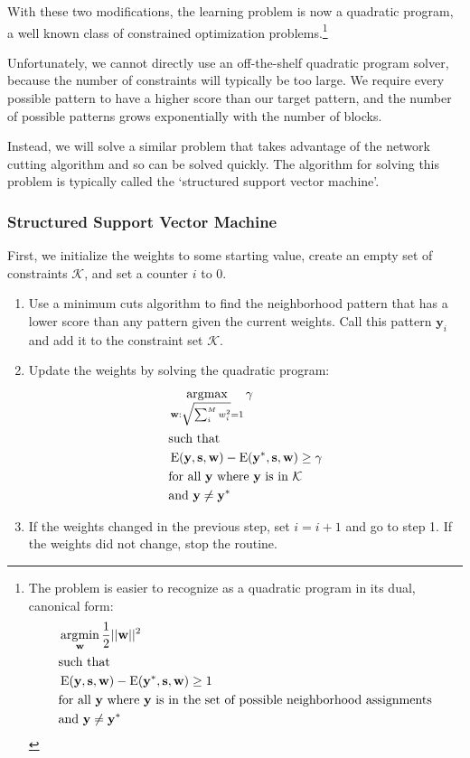 With these two modifications, the learning problem is now a quadratic
program, a well known class of constrained optimization
problems.\footnote{The problem is easier to recognize as a quadratic
  program in its dual, canonical form:
%
\begin{align*}
&\operatorname*{\arg\!\min}_{\mathbf{w}} \frac{1}{2}||\mathbf{w}||^2 \\
&\text{such that} \\
&\operatorname{E}(\mathbf{y}, \mathbf{s}, \mathbf{w})
- \operatorname{E}(\mathbf{y}^*, \mathbf{s}, \mathbf{w}) \geq 1 \\ 
&\text{for all } \mathbf{y} \text{ where } \mathbf{y} \text{ is in the set of
  possible neighborhood assignments}\\
&\text{and } \mathbf{y} \neq \mathbf{y}^*
\end{align*}
}

Unfortunately, we cannot directly use an off-the-shelf quadratic
program solver, because the number of constraints will typically be
too large. We require every possible pattern to have a higher
score than our target pattern, and the number of possible patterns
grows exponentially with the number of blocks.

Instead, we will solve a similar problem that takes advantage of the
network cutting algorithm and so can be solved
quickly. The algorithm for solving this problem is typically called
the `structured support vector machine'\cite{szummer_learning_2008}.
 

\subsubsection{Structured Support Vector Machine}
First, we initialize the weights to some starting value, create an
empty set of constraints $\mathcal{K}$, and set a counter $i$ to $0$.
\begin{enumerate}
\item Use a minimum cuts algorithm to find the neighborhood pattern
  that has a lower score than any pattern given the current weights.
  Call this pattern $\mathbf{y}_i$ and add it to the constraint
  set $\mathcal{K}$.

\item Update the weights by solving the quadratic program: 
%
\begin{align*}
&\operatorname*{\arg\!\max}_{\mathbf{w}:\sqrt{\sum_i^M w_i^2}=1} \mathbf{\gamma} \\
&\text{such that} \\
&\operatorname{E}(\mathbf{y}, \mathbf{s}, \mathbf{w})
- \operatorname{E}(\mathbf{y}^*, \mathbf{s}, \mathbf{w}) \geq \gamma\\ 
&\text{for all } \mathbf{y} \text{ where } \mathbf{y} \text{ is in } \mathcal{K}\\
&\text{and } \mathbf{y} \neq \mathbf{y}^*
\end{align*}
%

\item If the weights changed in the previous step, set $i = i + 1$ and
  go to step 1. If the weights did not change, stop the routine.
\end{enumerate}

